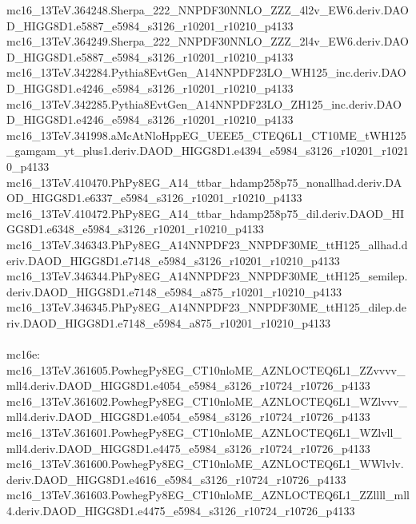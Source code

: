 \begin{footnotesize}
mc16\_13TeV.364248.Sherpa\_222\_NNPDF30NNLO\_ZZZ\_4l2v\_EW6.deriv.DAOD\_HIGG8D1.e5887\_e5984\_s3126\_r10201\_r10210\_p4133 \\
mc16\_13TeV.364249.Sherpa\_222\_NNPDF30NNLO\_ZZZ\_2l4v\_EW6.deriv.DAOD\_HIGG8D1.e5887\_e5984\_s3126\_r10201\_r10210\_p4133 \\
mc16\_13TeV.342284.Pythia8EvtGen\_A14NNPDF23LO\_WH125\_inc.deriv.DAOD\_HIGG8D1.e4246\_e5984\_s3126\_r10201\_r10210\_p4133 \\
mc16\_13TeV.342285.Pythia8EvtGen\_A14NNPDF23LO\_ZH125\_inc.deriv.DAOD\_HIGG8D1.e4246\_e5984\_s3126\_r10201\_r10210\_p4133 \\
mc16\_13TeV.341998.aMcAtNloHppEG\_UEEE5\_CTEQ6L1\_CT10ME\_tWH125\_gamgam\_yt\_plus1.deriv.DAOD\_HIGG8D1.e4394\_e5984\_s3126\_r10201\_r10210\_p4133 \\
mc16\_13TeV.410470.PhPy8EG\_A14\_ttbar\_hdamp258p75\_nonallhad.deriv.DAOD\_HIGG8D1.e6337\_e5984\_s3126\_r10201\_r10210\_p4133 \\
mc16\_13TeV.410472.PhPy8EG\_A14\_ttbar\_hdamp258p75\_dil.deriv.DAOD\_HIGG8D1.e6348\_e5984\_s3126\_r10201\_r10210\_p4133 \\
mc16\_13TeV.346343.PhPy8EG\_A14NNPDF23\_NNPDF30ME\_ttH125\_allhad.deriv.DAOD\_HIGG8D1.e7148\_e5984\_s3126\_r10201\_r10210\_p4133 \\
mc16\_13TeV.346344.PhPy8EG\_A14NNPDF23\_NNPDF30ME\_ttH125\_semilep.deriv.DAOD\_HIGG8D1.e7148\_e5984\_a875\_r10201\_r10210\_p4133 \\
mc16\_13TeV.346345.PhPy8EG\_A14NNPDF23\_NNPDF30ME\_ttH125\_dilep.deriv.DAOD\_HIGG8D1.e7148\_e5984\_a875\_r10201\_r10210\_p4133 \\
 \\
mc16e: \\
mc16\_13TeV.361605.PowhegPy8EG\_CT10nloME\_AZNLOCTEQ6L1\_ZZvvvv\_mll4.deriv.DAOD\_HIGG8D1.e4054\_e5984\_s3126\_r10724\_r10726\_p4133 \\
mc16\_13TeV.361602.PowhegPy8EG\_CT10nloME\_AZNLOCTEQ6L1\_WZlvvv\_mll4.deriv.DAOD\_HIGG8D1.e4054\_e5984\_s3126\_r10724\_r10726\_p4133 \\
mc16\_13TeV.361601.PowhegPy8EG\_CT10nloME\_AZNLOCTEQ6L1\_WZlvll\_mll4.deriv.DAOD\_HIGG8D1.e4475\_e5984\_s3126\_r10724\_r10726\_p4133 \\
mc16\_13TeV.361600.PowhegPy8EG\_CT10nloME\_AZNLOCTEQ6L1\_WWlvlv.deriv.DAOD\_HIGG8D1.e4616\_e5984\_s3126\_r10724\_r10726\_p4133 \\
mc16\_13TeV.361603.PowhegPy8EG\_CT10nloME\_AZNLOCTEQ6L1\_ZZllll\_mll4.deriv.DAOD\_HIGG8D1.e4475\_e5984\_s3126\_r10724\_r10726\_p4133 \\

\end{footnotesize}
